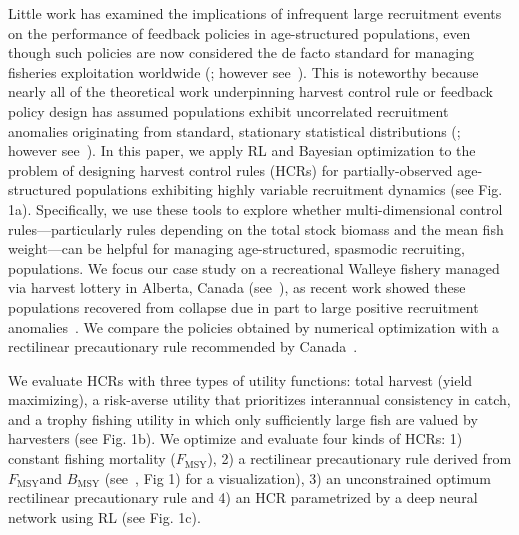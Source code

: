 \documentclass[floatfix,nofootinbib,longbibliography,notitlepage]{revtex4-2}
\def\textfmsy{$F_{\text{MSY}}$}
\def\bmsy{B_{\text{MSY}}}
\begin{document}
Little work has examined the implications of infrequent large recruitment events on the performance of feedback policies in age-structured populations, even though such policies are now considered the de facto standard for managing fisheries exploitation worldwide (\cite{silvar-viladomiu,free-etal-2023}; however see~\cite{licandeo-etal-2020}).
This is noteworthy because nearly all of the theoretical work underpinning harvest control rule or feedback policy design has assumed populations exhibit uncorrelated recruitment anomalies originating from standard, stationary statistical distributions (\cite{walters1975optimal,walters-hilborn-1978,reed1979optimal}; however see~\cite{parma1990experimental,hawkshaw2015harvest}). 
In this paper, we apply RL and Bayesian optimization to the problem of designing harvest control rules (HCRs) for partially-observed age-structured populations exhibiting highly variable recruitment dynamics (see Fig. 1a).  
Specifically, we use these tools to explore whether multi-dimensional control rules—particularly rules depending on the total stock biomass and the mean fish weight—can be helpful for managing age-structured, spasmodic recruiting, populations. 
We focus our case study on a recreational Walleye fishery managed via harvest lottery in Alberta, Canada (see~\cite{sullivan2003}), as recent work showed these populations recovered from collapse due in part to large positive recruitment anomalies~\cite{post-etal-2002,cahill2022}. 
We compare the policies obtained by numerical optimization with a rectilinear precautionary rule recommended by Canada~\cite{dfo2006}.  

We evaluate HCRs with three types of utility functions: total harvest (yield maximizing), a risk-averse utility that prioritizes interannual consistency in catch, and a trophy fishing utility in which only sufficiently large fish are valued by harvesters (see Fig. 1b). 
We optimize and evaluate four kinds of HCRs: 1) constant fishing mortality (\textfmsy), 2) a rectilinear precautionary rule derived from \textfmsy and $\bmsy$ (see~\cite{dfo2006}, Fig 1) for a visualization), 3) an unconstrained optimum rectilinear precautionary rule and 4) an HCR parametrized by a deep neural network using RL (see Fig. 1c).
\end{document}
